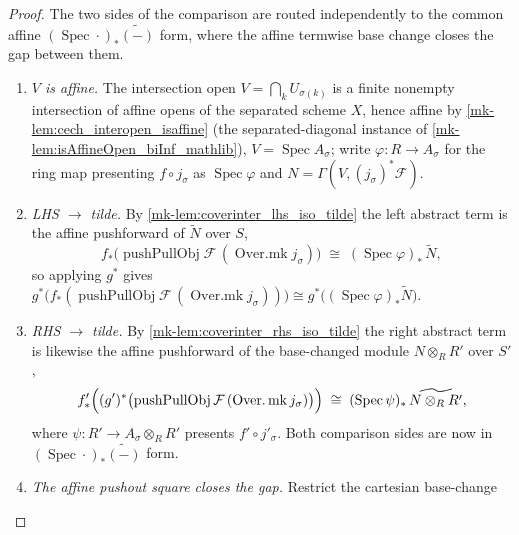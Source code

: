 \begin{proof}
  \leanok
  The two sides of the comparison are routed independently to the common affine
  \((\operatorname{Spec}\cdot)_*\widetilde{(-)}\) form, where the affine termwise base change
  closes the gap between them.
  \begin{enumerate}
    \item \emph{\(V\) is affine.} The intersection open
      \(V = \bigcap_k U_{\sigma(k)}\) is a finite nonempty intersection of affine opens of the
      separated scheme \(X\), hence affine by \ref{mk-lem:cech_interopen_isaffine} (the
      separated-diagonal instance of \ref{mk-lem:isAffineOpen_biInf_mathlib}),
      \(V = \operatorname{Spec} A_\sigma\); write \(\varphi : R \to A_\sigma\) for the ring map
      presenting \(f \circ j_\sigma\) as \(\operatorname{Spec}\varphi\) and
      \(N = \Gamma(V, (j_\sigma)^*\mathcal{F})\).
    \item \emph{LHS \(\to\) tilde.} By \ref{mk-lem:coverinter_lhs_iso_tilde} the left abstract
      term is the affine pushforward of \(\widetilde{N}\) over \(S\),
      \[
        f_*\bigl(\operatorname{pushPullObj}\mathcal{F}\,(\operatorname{Over.mk} j_\sigma)\bigr)
          \;\cong\; (\operatorname{Spec}\varphi)_*\,\widetilde{N},
      \]
      so applying \(g^*\) gives
      \(g^*\bigl(f_*(\operatorname{pushPullObj}\mathcal{F}\,(\operatorname{Over.mk}
      j_\sigma))\bigr) \cong g^*\bigl((\operatorname{Spec}\varphi)_*\widetilde{N}\bigr)\).
    \item \emph{RHS \(\to\) tilde.} By \ref{mk-lem:coverinter_rhs_iso_tilde} the right abstract
      term is likewise the affine pushforward of the base-changed module
      \(N \otimes_R R'\) over \(S'\),
      \[
        f'_*\Bigl((g')^*\bigl(\operatorname{pushPullObj}\mathcal{F}\,
          (\operatorname{Over.mk} j_\sigma)\bigr)\Bigr)
          \;\cong\; (\operatorname{Spec}\psi)_*\,\widetilde{N \otimes_R R'},
      \]
      where \(\psi : R' \to A_\sigma \otimes_R R'\) presents
      \(f' \circ j'_\sigma\). Both comparison sides are now in
      \((\operatorname{Spec}\cdot)_*\widetilde{(-)}\) form.
    \item \emph{The affine pushout square closes the gap.} Restrict the cartesian base-change

\end{enumerate}
\end{proof}
